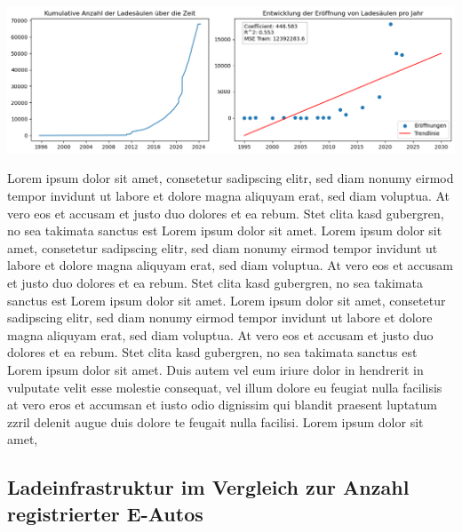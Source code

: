 \begin{center}
\includegraphics[scale=0.5]{img/output_5_0.png}
\end{center}

Lorem ipsum dolor sit amet, consetetur sadipscing elitr, sed diam nonumy eirmod tempor invidunt ut labore et dolore magna aliquyam erat, sed diam voluptua. At vero eos et accusam et justo duo dolores et ea rebum. Stet clita kasd gubergren, no sea takimata sanctus est Lorem ipsum dolor sit amet. Lorem ipsum dolor sit amet, consetetur sadipscing elitr, sed diam nonumy eirmod tempor invidunt ut labore et dolore magna aliquyam erat, sed diam voluptua. At vero eos et accusam et justo duo dolores et ea rebum. Stet clita kasd gubergren, no sea takimata sanctus est Lorem ipsum dolor sit amet. Lorem ipsum dolor sit amet, consetetur sadipscing elitr, sed diam nonumy eirmod tempor invidunt ut labore et dolore magna aliquyam erat, sed diam voluptua. At vero eos et accusam et justo duo dolores et ea rebum. Stet clita kasd gubergren, no sea takimata sanctus est Lorem ipsum dolor sit amet.   
Duis autem vel eum iriure dolor in hendrerit in vulputate velit esse molestie consequat, vel illum dolore eu feugiat nulla facilisis at vero eros et accumsan et iusto odio dignissim qui blandit praesent luptatum zzril delenit augue duis dolore te feugait nulla facilisi. Lorem ipsum dolor sit amet,

\subsection{Ladeinfrastruktur im Vergleich zur Anzahl registrierter E-Autos}

